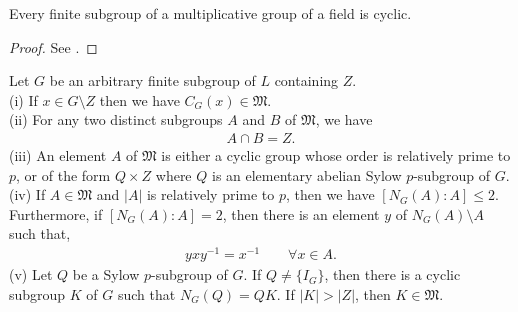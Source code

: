 \begin{lemma}\label{finsubcyc}
Every finite subgroup of a multiplicative group of a field is cyclic.
\end{lemma}

\begin{proof} 
  See \cite[p.41]{suzuki}.
\end{proof}

\begin{theorem}\label{6.8} Let $G$ be an arbitrary finite subgroup of $L$ containing $Z$. \\
(i) If $x \in G \! \setminus \! Z$ then we have $C_G(x) \in \mathfrak{M}$. \vspace{3mm} \\
(ii) For any two distinct subgroups $A$ and $B$ of $\mathfrak{M}$, we have
\begin{align*} A \cap B = Z. \end{align*}
(iii) An element $A$ of $\mathfrak{M}$ is either a cyclic group whose order is relatively prime to $p$, or of the form $Q \times Z$ where $Q$ is an elementary abelian Sylow $p$-subgroup of $G$. \vspace{3mm} \\
(iv) If $A \in \mathfrak{M}$ and $|A|$ is relatively prime to $p$, then we have $[N_G(A): A] \leq 2$. Furthermore, if $[N_G(A): A] = 2$, then there is an element $y$ of $N_G(A) \! \setminus \! A$ such that, 
\vspace{-1mm}
\begin{align*} yxy^{-1} = x^{-1} \qquad \forall x \in A.\end{align*}
(v) Let $Q$ be a Sylow $p$-subgroup of $G$. If $Q \neq \{I_G\}$, then there is a cyclic subgroup $K$ of $G$ such that $N_G(Q) = QK$. If $|K| > |Z|$, then $K \in \mathfrak{M}$. \\
\end{theorem}

